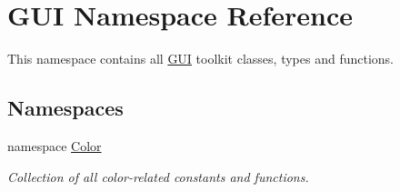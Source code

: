 \hypertarget{namespaceGUI}{\section{G\-U\-I Namespace Reference}
\label{namespaceGUI}
}


This namespace contains all \hyperlink{namespaceGUI}{G\-U\-I} toolkit classes, types and functions.  


\subsection*{Namespaces}
\begin{DoxyCompactItemize}
\item 
namespace \hyperlink{namespaceGUI_1_1Color}{Color}
\begin{DoxyCompactList}\small\item\em Collection of all color-\/related constants and functions. \end{DoxyCompactList}\end{DoxyCompactItemize}
